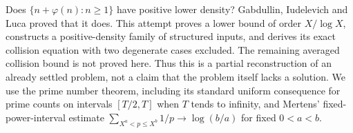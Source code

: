 Does $\{n+\varphi(n):n\ge1\}$ have positive lower density? Gabdullin, Iudelevich and Luca proved that it does. This attempt proves a lower bound of order $X/\log X$, constructs a positive-density family of structured inputs, and derives its exact collision equation with two degenerate cases excluded. The remaining averaged collision bound is not proved here. Thus this is a partial reconstruction of an already settled problem, not a claim that the problem itself lacks a solution.
We use the prime number theorem, including its standard uniform consequence for prime counts on intervals $[T/2,T]$ when $T$ tends to infinity, and Mertens' fixed-power-interval estimate $\sum_{X^a<p\le X^b}1/p\to\log(b/a)$ for fixed $0<a<b$.
